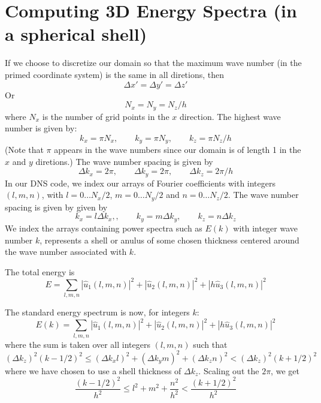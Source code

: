 \documentclass[12pt]{article}
\begin{document}
\section{Computing 3D Energy Spectra (in a spherical shell)}
If we choose to discretize our domain so that the 
maximum wave number (in the primed coordinate system) is
the same in all diretions, then
\[
\Delta x' = \Delta y' = \Delta z'
\]
Or
\[
N_x  = N_y = N_z/h
\]
where $N_x$ is the number of grid points in the $x$ direction.
The highest wave number is given by:
\[
k_x = \pi N_x, \qquad k_y = \pi N_y, \qquad k_z = \pi N_z/h 
\]
(Note that $\pi$ appears in the wave numbers since our domain is
of length 1 in the $x$ and $y$ diretions.)  The wave number spacing
is given by
\[
\Delta k_x = 2 \pi, \qquad  \Delta k_y = 2 \pi, \qquad  \Delta k_z = 2 \pi / h 
\]
In our DNS code, we index our arrays of Fourier coefficients
with integers $(l,m,n)$, with $l=0 \dots N_x/2$, 
$m=0 \dots N_y/2$ and 
$n=0 \dots N_z/2$.  The wave number spacing is given by
given by
\[
k_x = l \Delta k_x,, \qquad  k_y = m \Delta k_y, \qquad  k_z = n  \Delta k_z
\]
We index the arrays containing power spectra
such as $E(k)$ with integer wave number $k$, represents a shell or anulus
of some chosen thickness centered around the wave number associated
with $k$.

The total energy is
\[
E  = \sum_{l,m,n}  |  {\hat u_1}(l,m,n) |^2 +
 |  {\hat u_2}(l,m,n) |^2 + 
 |  h {\hat u_3}(l,m,n) |^2
\]

The standard energy spectrum is now, for integers $k$:
\[
E(k)  = \sum_{l,m,n}  |  {\hat u_1}(l,m,n) |^2 +
 |  {\hat u_2}(l,m,n) |^2 + 
 |  h {\hat u_3}(l,m,n) |^2
\]
where the sum is taken over all integers $(l,m,n)$ such that
\[
(\Delta k_z)^2 (k-1/2)^2 \le (\Delta k_x l)^2 + (\Delta k_y m)^2 + (\Delta k_z n)^2 <  (\Delta k_z)^2 (k+1/2)^2 
\]
where we have chosen to use a shell thickness of $\Delta k_z$.
 Scaling out the $2\pi$, we get
\[
\frac{(k-1/2)^2}{h^2} \le l^2 + m^2 + \frac{n^2}{h^2} < \frac{(k+1/2)^2}{h^2}
\]  
\end{document}
